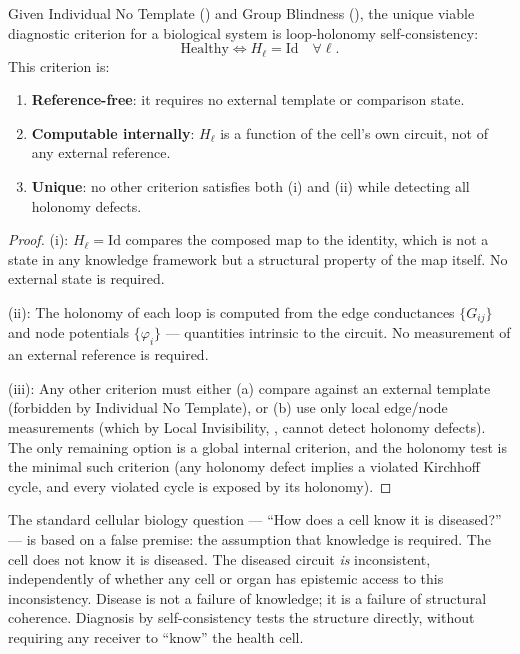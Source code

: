 \documentclass[twocolumn,11pt,a4paper]{article}
\newcommand{\HolL}{H_\ell}
\begin{document}
\begin{tcolorbox}
\begin{theorem}\label{thm:primacy}
Given Individual No Template () and Group Blindness
(), the unique viable diagnostic criterion for a
biological system is loop-holonomy self-consistency:
\[
\text{Healthy} \iff \HolL = \mathrm{Id} \quad \forall\ell.
\]
This criterion is:
\begin{enumerate}[label=(\roman*),leftmargin=*,nosep]
\item \textbf{Reference-free}: it requires no external template or comparison
      state.
\item \textbf{Computable internally}: $\HolL$ is a function of the cell's
      own circuit, not of any external reference.
\item \textbf{Unique}: no other criterion satisfies both (i) and (ii) while
      detecting all holonomy defects.
\end{enumerate}
\end{theorem}
\end{tcolorbox}

\begin{proof}
(i): $\HolL = \mathrm{Id}$ compares the composed map to the identity, which
is not a state in any knowledge framework but a structural property of the
map itself. No external state is required.

(ii): The holonomy of each loop is computed from the edge conductances
$\{G_{ij}\}$ and node potentials $\{\varphi_i\}$ --- quantities intrinsic
to the circuit. No measurement of an external reference is required.

(iii): Any other criterion must either (a) compare against an external
template (forbidden by Individual No Template), or (b) use only local
edge/node measurements (which by Local Invisibility,
, cannot detect holonomy defects). The only
remaining option is a global internal criterion, and the holonomy test is
the minimal such criterion (any holonomy defect implies a violated
Kirchhoff cycle, and every violated cycle is exposed by its holonomy).
\end{proof}

\begin{remark}\label{rem:paradox}
The standard cellular biology question --- ``How does a cell know it is
diseased?'' --- is based on a false premise: the assumption that knowledge
is required. The cell does not know it is diseased. The diseased circuit
\emph{is} inconsistent, independently of whether any cell or organ has
epistemic access to this inconsistency. Disease is not a failure of
knowledge; it is a failure of structural coherence. Diagnosis by
self-consistency tests the structure directly, without requiring any
receiver to ``know'' the health cell.
\end{remark}
\end{document}
